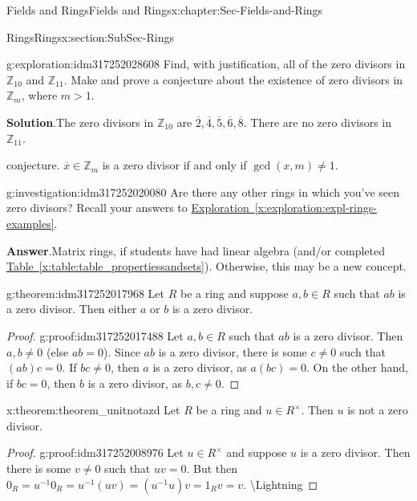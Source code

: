 \documentclass[oneside,10pt,]{book}
\newcommand{\blocktitlefont}{\relax}
\newcommand{\xreffont}{\relax}
\numberwithin{equation}{section}
\def\Z{{\mathbb Z}}
\begin{document}
\begin{chapterptx}{Fields and Rings}{}{Fields and Rings}{}{}{x:chapter:Sec-Fields-and-Rings}
\begin{sectionptx}{Rings}{}{Rings}{}{}{x:section:SubSec-Rings}
\begin{exploration}{}{g:exploration:idm317252028608}%
Find, with justification, all of the zero divisors in \(\Z_{10}\) and \(\Z_{11}\). Make and prove a conjecture about the existence of zero divisors in \(\Z_m\), where \(m > 1\).%
\par\smallskip%
\noindent\textbf{\blocktitlefont Solution}.\hypertarget{g:solution:idm317252023440}{}\quad{}The zero divisors in \(\Z_{10}\) are \(\overline{2}, \overline{4}, \overline{5}, \overline{6},\overline{8}\). There are no zero divisors in \(\Z_{11}\).%
\par
conjecture. \(\overline{x}\in \Z_m\) is a zero divisor if and only if \(\gcd(x,m) \ne 1\).%
\end{exploration}
\begin{investigation}{}{g:investigation:idm317252020080}%
Are there any other rings in which you've seen zero divisors? Recall your answers to \hyperref[x:exploration:expl-rings-examples]{Exploration~{\xreffont\ref{x:exploration:expl-rings-examples}}}.%
\par\smallskip%
\noindent\textbf{\blocktitlefont Answer}.\hypertarget{g:answer:idm317252018992}{}\quad{}Matrix rings, if students have had linear algebra (and\slash{}or completed \hyperref[x:table:table_propertiessandsets]{Table~{\xreffont\ref{x:table:table_propertiessandsets}}}). Otherwise, this may be a new concept.%
\end{investigation}
\begin{theorem}{}{}{g:theorem:idm317252017968}%
Let \(R\) be a ring and suppose \(a,b\in R\) such that \(ab\) is a zero divisor. Then either \(a\) or \(b\) is a zero divisor.%
\end{theorem}
\begin{proof}{}{g:proof:idm317252017488}
Let \(a,b\in R\) such that \(ab\) is a zero divisor. Then \(a,b\ne 0\) (else \(ab = 0\)). Since \(ab\) is a zero divisor, there is some \(c\ne 0\) such that \((ab) c = 0\). If \(bc\ne 0\), then \(a\) is a zero divisor, as \(a(bc) = 0\). On the other hand, if \(bc=0\), then \(b\) is a zero divisor, as \(b,c\ne 0\).%
\end{proof}
\begin{theorem}{}{}{x:theorem:theorem_unitnotazd}%
Let \(R\) be a ring and \(u\in R^\times\). Then \(u\) is not a zero divisor.%
\end{theorem}
\begin{proof}{}{g:proof:idm317252008976}
Let \(u\in R^\times\) and suppose \(u\) is a zero divisor. Then there is some \(v\ne 0\) such that \(uv = 0\). But then \(0_R = u^{-1} 0_R = u^{-1} (uv) = (u^{-1} u) v = 1_R v = v\). \textbackslash{}Lightning%

\end{proof}
\end{sectionptx}
\end{chapterptx}
\end{document}
